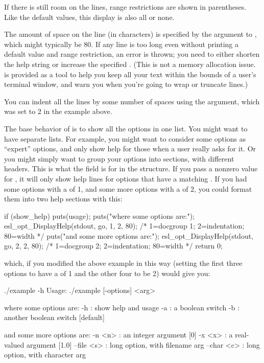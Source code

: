If there is still room on the lines, range restrictions are shown in
parentheses. Like the default values, this display is also all or
none.

The amount of space on the line (in characters) is specified by the
 argument to , which
might typically be 80. If any line is too long even without printing a
default value and range restriction, an error is thrown; you need to
either shorten the help string or increase the specified
. (This is not a memory allocation
issue.  is provided as a tool to help you keep all
your text within the bounds of a user's terminal window, and warn you
when you're going to wrap or truncate lines.)

You can indent all the lines by some number of spaces using the
 argument, which was set to 2 in the example above.


The base behavior of  is to show all
the options in one list. You might want to have separate lists. For
example, you might want to consider some options as ``expert''
options, and only show help for those when a user really asks for it.
Or you might simply want to group your options into sections, with
different headers. This is what the  field is for
in the  structure. If you pass
 a nonzero value for ,
it will only show help lines for options that have a matching
. If you had some options with a
 of 1, and some more options with a 
 of 2, you could format them into two help sections
with this:

\begin{cchunk}
 if (show_help) {
    puts(usage); 
    puts("\n  where some options are:");
    esl_opt_DisplayHelp(stdout, go, 1, 2, 80); /* 1=docgroup 1; 2=indentation; 80=width */
    puts("\n  and some more options are:");
    esl_opt_DisplayHelp(stdout, go, 2, 2, 80); /* 1=docgroup 2; 2=indentation; 80=width */
    return 0;
  }
\end{cchunk}

which, if you modified the above example in this way (setting the
first three options to have a  of 1 and the other
four to be 2) would give you:

\begin{cchunk}
./example -h
Usage: ./example [-options] <arg>

  where some options are:
  -h : show help and usage
  -a : a boolean switch
  -b : another boolean switch  [default]

  and some more options are:
  -n <n>     : an integer argument  [0]
  -x <x>     : a real-valued argument  [1.0]
  --file <s> : long option, with filename arg
  --char <c> : long option, with character arg
\end{cchunk}




